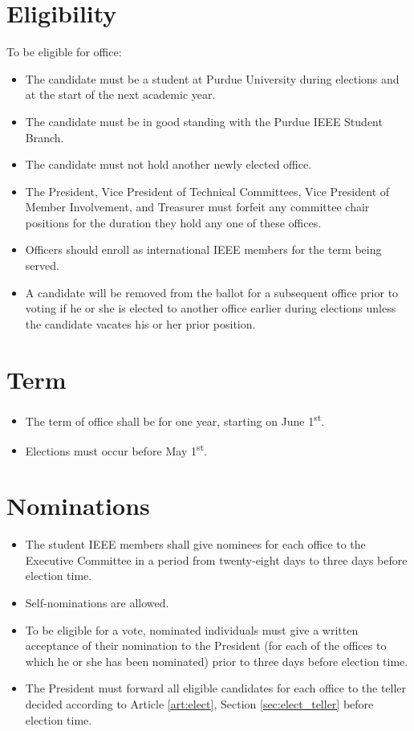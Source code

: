 \documentclass[12pt]{constitution}
\newcommand{\datetermstart}{June 1\textsuperscript{st}} %
\newcommand{\dateelectionsheld}{May 1\textsuperscript{st}} %
\begin{document}
\section{Eligibility}
\label{sec:elect_elig}
To be eligible for office:
\begin{itemize}
    \item The candidate must be a student at Purdue University during elections and at the start of the next academic year.
    \item The candidate must be in good standing with the Purdue IEEE Student Branch.
    \item The candidate must not hold another newly elected office.
    \item The President, Vice President of Technical Committees, Vice President of Member Involvement, and Treasurer must forfeit any committee chair positions for the duration they hold any one of these offices.
    \item Officers should enroll as international IEEE members for the term being served.
    \item A candidate will be removed from the ballot for a subsequent office prior to voting if he or she is elected to another office earlier during elections unless the candidate vacates his or her prior position.
\end{itemize}

\section{Term}
\label{sec:elect_term}
\begin{itemize}
    \item The term of office shall be for one year, starting on \datetermstart{}.
    \item Elections must occur before \dateelectionsheld{}.
\end{itemize}

\section{Nominations}
\label{sec:elect_nom}
\begin{itemize}
    \item The student IEEE members shall give nominees for each office to the Executive Committee in a period from twenty-eight days to three days before election time.
    \item Self-nominations are allowed.
    \item To be eligible for a vote, nominated individuals must give a written acceptance of their nomination to the President (for each of the offices to which he or she has been nominated) prior to three days before election time.
    \item The President must forward all eligible candidates for each office to the teller decided according to Article \ref{art:elect}, Section \ref{sec:elect_teller} before election time.
\end{itemize}
\end{document}
